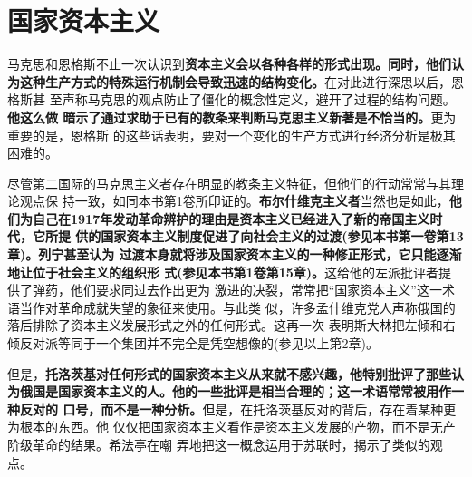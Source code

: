 \section{国家资本主义}
马克思和恩格斯不止一次认识到\textbf{资本主义会以各种各样的形式出现。同时，他们认
  为这种生产方式的特殊运行机制会导致迅速的结构变化。}在对此进行深思以后，恩格斯甚
至声称马克思的观点防止了僵化的概念性定义，避开了过程的结构问题。\textbf{他这么做
  暗示了通过求助于已有的教条来判断马克思主义新著是不恰当的。}更为重要的是，恩格斯
的这些话表明，要对一个变化的生产方式进行经济分析是极其困难的。

尽管第二国际的马克思主义者存在明显的教条主义特征，但他们的行动常常与其理论观点保
持一致，如同本书第1卷所印证的。\textbf{布尔什维克主义者}当然也是如此，\textbf{他
  们为自己在1917年发动革命辨护的理由是资本主义已经进入了新的帝国主义时代，它所提
  供的国家资本主义制度促进了向社会主义的过渡(参见本书第一卷第13章)。列宁甚至认为
  过渡本身就将涉及国家资本主义的一种修正形式，它只能逐渐地让位于社会主义的组织形
  式(参见本书第1卷第15章)。}这给他的左派批评者提供了弹药，他们要求同过去作出更为
激进的决裂，常常把“国家资本主义”这一术语当作对革命成就失望的象征来使用。与此类
似，许多孟什维克党人声称俄国的落后排除了资本主义发展形式之外的任何形式。这再一次
表明斯大林把左倾和右倾反对派等同于一个集团并不完全是凭空想像的(参见以上第2章)。

但是，\textbf{托洛茨基对任何形式的国家资本主义从来就不感兴趣，他特别批评了那些认
  为俄国是国家资本主义的人。他的一些批评是相当合理的；这一术语常常被用作一种反对的
  口号，而不是一种分析。}但是，在托洛茨基反对的背后，存在着某种更为根本的东西。他
仅仅把国家资本主义看作是资本主义发展的产物，而不是无产阶级革命的结果。希法亭在嘲
弄地把这一概念运用于苏联时，揭示了类似的观点。

